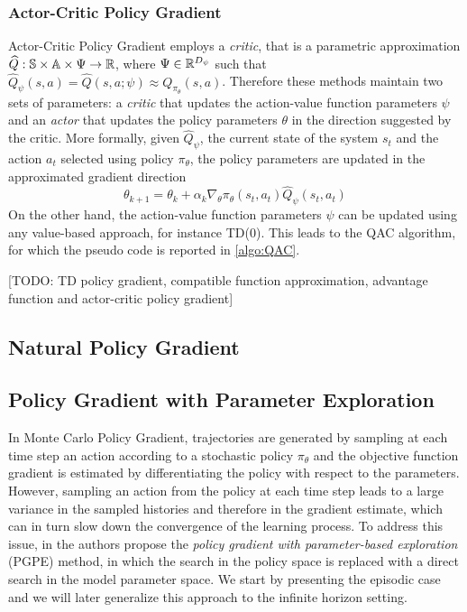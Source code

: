 \subsubsection{Actor-Critic Policy Gradient}
Actor-Critic Policy Gradient employs a \emph{critic}, that is a parametric
approximation $\widehat{Q}: \mathbb{S} \times \mathbb{A} \times \Psi \to \mathbb{R}$, where $\Psi \in
\mathbb{R}^{D_\psi}$ such that $\widehat{Q}_\psi(s, a) = \widehat{Q}(s, a; \psi)
\approx Q_{\pi_\theta}(s,a)$. Therefore these methods maintain two sets of
parameters: a \emph{critic} that updates the action-value function parameters
$\psi$ and an \emph{actor} that updates the policy parameters $\theta$ in the
direction suggested by the critic. More formally, given $\widehat{Q}_\psi$, the
current state of the system $s_t$ and the action $a_t$ selected using policy
$\pi_\theta$, the policy parameters are updated in the approximated gradient 
direction
\begin{equation}
	\theta_{k+1} = \theta_k + \alpha_k \nabla_\theta \pi_\theta(s_t, a_t) 
	\widehat{Q}_\psi(s_t, a_t) 
\end{equation}
On the other hand, the action-value function parameters $\psi$ can be updated
using any value-based approach, for instance TD(0). This leads to the QAC
algorithm, for which the pseudo code is reported in \ref{algo:QAC}.

[TODO: TD policy gradient,
compatible function approximation, advantage function and actor-critic policy
gradient]

\subsection{Natural Policy Gradient}

\subsection{Policy Gradient with Parameter Exploration}
In Monte Carlo Policy Gradient, trajectories are generated by sampling at each
time step an action according to a stochastic policy $\pi_\theta$ and the
objective function gradient is estimated by differentiating the policy with
respect to the parameters. However, sampling an action from the policy at each
time step leads to a large variance in the sampled histories and therefore in 
the gradient estimate, which can in turn slow down the convergence of the
learning process. To address this issue, in \cite{sehnke2008policy} the authors
propose the \emph{policy gradient with parameter-based exploration} (PGPE)
method, in which the search in the policy space is replaced with a direct
search in the model parameter space. We start by presenting the episodic case
and we will later generalize this approach to the infinite horizon setting.  

